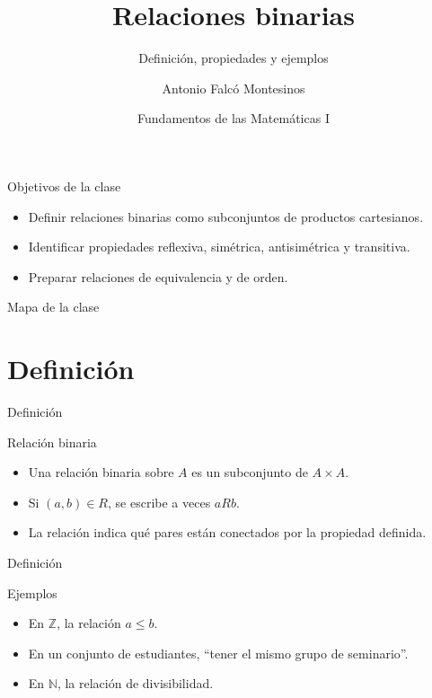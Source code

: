 \documentclass[aspectratio=169,11pt]{beamer}
\title[FdM I -- Clase 10]{Relaciones binarias}
\subtitle{Definición, propiedades y ejemplos}
\author{Antonio Falcó Montesinos}
\institute{Universidad CEU Cardenal Herrera}
\date{Fundamentos de las Matemáticas I}
\begin{document}
\begin{frame}
  \titlepage
\end{frame}

\begin{frame}{Objetivos de la clase}
\begin{itemize}
  \item Definir relaciones binarias como subconjuntos de productos cartesianos.
  \item Identificar propiedades reflexiva, simétrica, antisimétrica y transitiva.
  \item Preparar relaciones de equivalencia y de orden.
\end{itemize}
\end{frame}

\begin{frame}{Mapa de la clase}
\tableofcontents
\end{frame}

\section{Definición}

\begin{frame}{Definición}
\begin{block}{Relación binaria}
\begin{itemize}
  \item Una relación binaria sobre \(A\) es un subconjunto de \(A\times A\).
  \item Si \((a,b)\in R\), se escribe a veces \(aRb\).
  \item La relación indica qué pares están conectados por la propiedad definida.
\end{itemize}
\end{block}
\end{frame}

\begin{frame}{Definición}
\begin{block}{Ejemplos}
\begin{itemize}
  \item En \(\mathbb{Z}\), la relación \(a\leq b\).
  \item En un conjunto de estudiantes, ``tener el mismo grupo de seminario''.
  \item En \(\mathbb{N}\), la relación de divisibilidad.
\end{itemize}
\end{block}
\end{frame}
\end{document}
